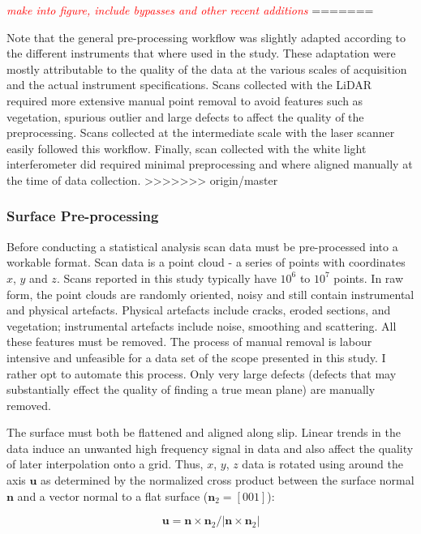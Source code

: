 \documentclass[12pt,a4paper]{article}
\begin{document}
\textcolor{red}{\textit{make into figure, include bypasses and other recent additions}}  
=======
  
Note that the general pre-processing workflow was slightly adapted according to the different instruments that where used in the study. These adaptation were mostly attributable to the quality of the data at the various scales of acquisition and the actual instrument specifications. Scans collected with the LiDAR required more extensive manual point removal to avoid features such as vegetation, spurious outlier and large defects to affect the quality of the preprocessing. Scans collected at the intermediate scale with the laser scanner easily followed this workflow. Finally, scan collected with the white light interferometer did required minimal preprocessing and where aligned manually at the time of data collection. 
>>>>>>> origin/master

		\subsubsection{Surface Pre-processing}

Before conducting a statistical analysis scan data must be pre-processed into a workable format. Scan data is a point cloud - a series of points with coordinates $x$, $y$ and $z$. Scans reported in this study typically have $10^6$ to $ 10^7$ points. In raw form, the point clouds are randomly oriented, noisy and still contain instrumental and physical artefacts. Physical artefacts include cracks, eroded sections, and vegetation; instrumental artefacts include noise, smoothing and scattering. All these features must be removed. The process of manual removal is labour intensive and unfeasible for a data set of the scope presented in this study. I rather opt to automate this process. Only very large defects (defects that may substantially effect the quality of finding a true mean plane) are manually removed.


The surface must both be flattened and aligned along slip. Linear trends in the data induce an unwanted high frequency signal in data and also affect the quality of later interpolation onto a grid. Thus, $x$, $y$, $z$ data is rotated using around the axis $\textbf{u}$ as determined by the normalized cross product between the surface normal $\textbf{n}$ and a vector normal to a flat surface ($\textbf{n}_2 = [0 0 1]$): 

$$ \textbf{u} = {\textbf{n}\times\textbf{n}_2}/{|{\textbf{n}\times\textbf{n}_2}|} $$
\end{document}
